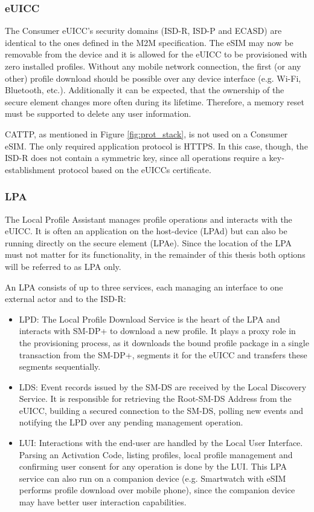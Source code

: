 \subsubsection{eUICC}
The Consumer eUICC's security domains (ISD-R, ISD-P and ECASD) are identical to the ones defined in the M2M specification. The eSIM may now be removable from the device and it is allowed for the eUICC to be provisioned with zero installed profiles. Without any mobile network connection, the first (or any other) profile download should be possible over any device interface (e.g. Wi-Fi, Bluetooth, etc.). Additionally it can be expected, that the ownership of the secure element changes more often during its lifetime. Therefore, a memory reset must be supported to delete any user information.

\acrshort{CATTP}, as mentioned in Figure \ref{fig:prot_stack}, is not used on a Consumer eSIM. The only required application protocol is \acrshort{HTTPS}. In this case, though, the ISD-R does not contain a symmetric key, since all operations require a key-establishment protocol based on the eUICCs certificate.

\subsubsection{LPA}
The Local Profile Assistant manages profile operations and interacts with the eUICC. It is often an application on the host-device (LPAd) but can also be running directly on the secure element (LPAe). Since the location of the LPA must not matter for its functionality, in the remainder of this thesis both options will be referred to as \acrshort{LPA} only.

An LPA consists of up to three services, each managing an interface to one external actor and to the ISD-R:
\begin{itemize}
    \item LPD: The Local Profile Download Service is the heart of the LPA and interacts with SM-DP+ to download a new profile. It plays a proxy role in the provisioning process, as it downloads the bound profile package in a single transaction from the SM-DP+, segments it for the eUICC and transfers these segments sequentially.
    \item LDS: Event records issued by the SM-DS are received by the Local Discovery Service. It is responsible for retrieving the Root-SM-DS Address from the eUICC, building a secured connection to the SM-DS, polling new events and notifying the LPD over any pending management operation.
    \item LUI: Interactions with the end-user are handled by the Local User Interface. Parsing an Activation Code, listing profiles, local profile management and confirming user consent for any operation is done by the LUI. This LPA service can also run on a companion device (e.g. Smartwatch with eSIM performs profile download over mobile phone), since the companion device may have better user interaction capabilities. 
\end{itemize}

